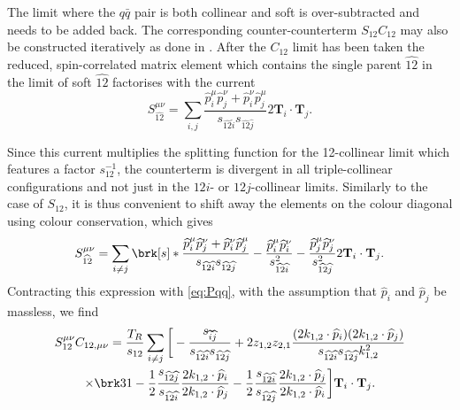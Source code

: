\documentclass[11pt,a4paper]{article}
\newcommand{\colorT}[1]{\mathbf{T}_{#1}}
\newcommand{\mpd}[1]{\widehat{#1}}
\begin{document}
The limit where the $q\bar{q}$ pair is both collinear and soft is over-subtracted
and needs to be added back.
The corresponding counter-counterterm $S_{12}C_{12}$
may also be constructed iteratively as done in \cite{Somogyi:2005xz}.
After the $C_{12}$ limit has been taken the reduced, spin-correlated matrix element 
which contains the single parent $\mpd{12}$ in the limit of soft $\mpd{12}$
factorises with the current
\begin{equation}
	S_{\mpd{12}}^{\mu\nu}
	= \sum_{i, j}
	\frac{\mpd{p}_i^\mu \mpd{p}_j^\nu + \mpd{p}_i^\nu \mpd{p}_j^\mu}
	{s_{\mpd{12}\mpd{i}} s_{\mpd{12}\mpd{j}}}
	2\colorT{i}\cdot\colorT{j}.
\end{equation}

Since this current multiplies the splitting function for the 12-collinear limit
which features a factor $s_{12}^{-1}$,
the counterterm is divergent in all triple-collinear configurations
and not just in the $12i$- or $12j$-collinear limits.
Similarly to the case of $S_{12}$, it is thus convenient
to shift away the elements on the colour diagonal using colour conservation,
which gives
\begin{equation}
	S_{\mpd{12}}^{\mu\nu}
	= \sum_{i \ne j} \brk[s]*{
		\frac{\mpd{p}_i^\mu \mpd{p}_j^\nu + \mpd{p}_i^\nu \mpd{p}_j^\mu}
		{s_{\mpd{12}\mpd{i}} s_{\mpd{12}\mpd{j}}}
		- \frac{\mpd{p}_i^\mu \mpd{p}_i^\nu}{s_{\mpd{12}\mpd{i}}^2}
		- \frac{\mpd{p}_j^\mu \mpd{p}_j^\nu}{s_{\mpd{12}\mpd{j}}^2}
	} 2 \colorT{i}\cdot\colorT{j}.
\end{equation}
Contracting this expression with \cref{eq:Pqq},
with the assumption that $\mpd{p}_i$ and $\mpd{p}_j$
be massless, we find
\begin{multline}
\label{eq:S12C12iter}
	S_{12}^{\mu\nu} C_{12,\mu\nu}
	= \frac{T_R}{s_{12}} \sum_{i \ne j} \bigg[
		- \frac{s_{\mpd{i}\mpd{j}}}{s_{\mpd{12}\mpd{i}}s_{\mpd{12}\mpd{j}}}
		+ 2 z_{1,2} z_{2,1}
		\frac{(2k_{1,2}\cdot\mpd{p}_i)(2k_{1,2}\cdot\mpd{p}_j)}
		{s_{\mpd{12}\mpd{i}} s_{\mpd{12}\mpd{j}} k_{1,2}^2}
		\\\times
		\brk3{ 1
		- \frac{1}{2} \frac{s_{\mpd{12}\mpd{j}}}{s_{\mpd{12}\mpd{i}}}
		\frac{2k_{1,2}\cdot\mpd{p}_i}{2k_{1,2}\cdot\mpd{p}_j}
		- \frac{1}{2} \frac{s_{\mpd{12}\mpd{i}}}{s_{\mpd{12}\mpd{j}}}
		\frac{2k_{1,2}\cdot\mpd{p}_j}{2k_{1,2}\cdot\mpd{p}_i}
		}
	\bigg] \colorT{i}\cdot\colorT{j}.
\end{multline}
\end{document}
